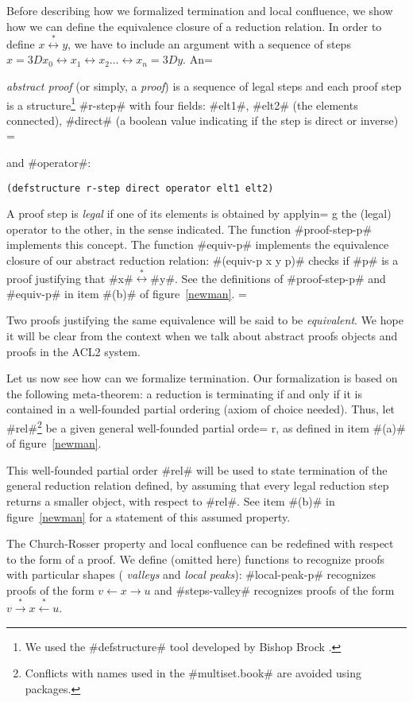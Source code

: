 \documentclass[11pt]{llncs}
\newcommand{\red}{\rightarrow}
\newcommand{\redtr}{\stackrel{*}{\red}}
\newcommand{\redi}{\leftarrow}
\newcommand{\reditr}{\stackrel{*}{\redi}}
\newcommand{\rred}{\leftrightarrow}
\newcommand{\rede}{\stackrel{*}{\rred}}
\begin{document}
{Before describing how we formalized termination and local confluence, we
show how we can define the equivalence closure of a reduction relation.
In order to define $x\rede y$, we have to include an argument with a
sequence of steps $x=3Dx_0 \rred x_1 \rred x_2 \ldots \rred x_n=3Dy$.  An=

{\em abstract proof} (or simply, a {\em proof}) is a sequence of legal
steps and each proof step is a structure\footnote{We used the
#defstructure# tool developed by Bishop Brock \cite{defstructure}.}
#r-step# with four fields: #elt1#, #elt2# (the elements connected),
#direct# (a boolean value indicating if the step is direct or inverse) =

and #operator#:
\begin{verbatim}
(defstructure r-step direct operator elt1 elt2)
\end{verbatim}

A proof step is {\em legal} if one of its elements is obtained by applyin=
g
the (legal) operator to the other, in the sense indicated.  The
function #proof-step-p# implements this concept. The
function #equiv-p# implements the equivalence closure of our abstract
reduction relation: #(equiv-p x y p)# checks if #p# is a proof
justifying that #x#$\rede$#y#. See the definitions of #proof-step-p# and
#equiv-p# in item #(b)# of figure~\ref{newman}. =


Two proofs justifying the same equivalence will be said to be {\em
equivalent}. We hope it will be clear from the context when we talk
about abstract proofs objects and proofs in the ACL2 system.



Let us now see how can we formalize termination. Our formalization is
based on the following meta-theorem: a reduction is terminating if and
only if it is contained in a well-founded partial ordering (axiom of
choice needed). Thus,
let #rel#\footnote{Conflicts with names used in the #multiset.book#
are avoided using packages.} be a given general well-founded partial orde=
r, as defined in
item #(a)# of figure~\ref{newman}.

This well-founded partial order #rel# will be used to state
termination of the general reduction relation defined, by assuming
that every legal reduction step returns a smaller object, with respect
to #rel#. See item #(b)# in figure~\ref{newman} for a statement of this
assumed property.


The Church-Rosser property and local confluence can be redefined with
respect to the form of a proof. We define (omitted
here) functions to recognize proofs with particular shapes ({\em
valleys} and {\em local peaks}): #local-peak-p# recognizes proofs of the
form $v\redi x \red u$ and #steps-valley# recognizes proofs of the form
$v\redtr x \reditr u$.

}
\end{document}
